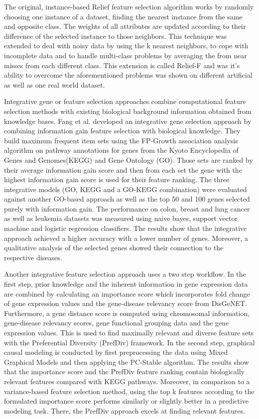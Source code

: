 The original, instance-based Relief feature selection algorithm works by randomly choosing one instance of a dataset, finding the nearest instance from the same and opposite class. The weights of all attributes are updated according to their difference of the selected instance to those neighbors. \cite{kira1992practical} This technique was extended to deal with noisy data by using the k nearest neighbors, to cope with incomplete data and to handle multi-class problems by averaging the  from near misses from each different class. This extension is called Relief-F and was it's ability to overcome the aforementioned problems was shown on different artificial as well as one real world dataset. \cite{Kononenko1994}

Integrative gene or feature selection approaches combine computational feature selection methods with existing biological background information obtained from knowledge bases. Fang et al. developed an integrative gene selection approach by combining information gain feature selection with biological knowledge. They build maximum frequent item sets using the FP-Growth association analysis algorithm on pathway annotations for genes from the Kyoto Encyclopedia of Genes and Genomes(KEGG) and Gene Ontology (GO). Those sets are ranked by their average information gain score and then from each set the gene with the highest information gain score is used for their feature ranking. The three integrative models (GO, KEGG and a GO-KEGG combination) were evaluated against another GO-based approach as well as the top 50 and 100 genes selected purely with information gain. The performance on colon, breast and lung cancer as well as leukemia datasets was measured using naive bayes, support vector machine and logistic regression classifiers. The results show that the integrative approach achieved a higher accuracy with a lower number of genes. Moreover, a qualitative analysis of the selected genes showed their connection to the respective diseases.\cite{fang2014integrative}

Another integrative feature selection approach uses a two step workflow. In the first step, prior knowledge and the inherent information in gene expression data are combined by calculating an importance score which incorporates fold change of gene expression values and the gene-disease relevancy score from DisGeNET. Furthermore, a gene distance score is computed using chromosomal information, gene-disease relevancy scores, gene functional grouping data and the gene expression values. This is used to find maximally relevant and diverse feature sets with the Preferential Diversity (PrefDiv) framework. In the second step, graphical causal modeling is conducted by first preprocessing the data using Mixed Graphical Models and then applying the PC-Stable algorithm. The results show that the importance score and the PrefDiv feature ranking contain biologically relevant features compared with KEGG pathways. Moreover, in comparison to a variance-based feature selection method, using the top k features according to the formulated importance score performs similarly or slightly better in a predictive modeling task. There, the PrefDiv approach excels at finding relevant features.
\cite{raghu2017integrated}